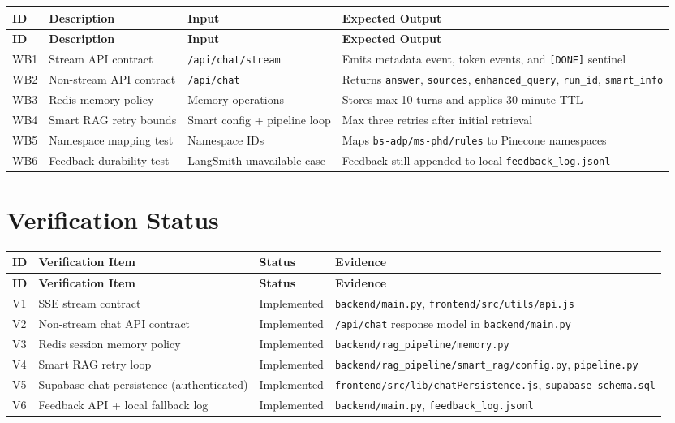 \documentclass[12pt,a4paper]{book}
\numberwithin{table}{chapter}
\numberwithin{figure}{chapter}
\numberwithin{equation}{chapter}
\begin{document}
\begin{longtable}{|p{0.5in}|p{1.5in}|p{1.5in}|p{1.5in}|}
\hline
\textbf{ID} & \textbf{Description} & \textbf{Input} & \textbf{Expected Output}\\
\hline
\endfirsthead
\hline
\textbf{ID} & \textbf{Description} & \textbf{Input} & \textbf{Expected Output}\\
\hline
\endhead
\hline
WB1 & Stream API contract & \texttt{/api/chat/stream} & Emits metadata event, token events, and \texttt{[DONE]} sentinel\\
\hline
WB2 & Non-stream API contract & \texttt{/api/chat} & Returns \texttt{answer}, \texttt{sources}, \texttt{enhanced\_query}, \texttt{run\_id}, \texttt{smart\_info}\\
\hline
WB3 & Redis memory policy & Memory operations & Stores max 10 turns and applies 30-minute TTL\\
\hline
WB4 & Smart RAG retry bounds & Smart config + pipeline loop & Max three retries after initial retrieval\\
\hline
WB5 & Namespace mapping test & Namespace IDs & Maps \texttt{bs-adp/ms-phd/rules} to Pinecone namespaces\\
\hline
WB6 & Feedback durability test & LangSmith unavailable case & Feedback still appended to local \texttt{feedback\_log.jsonl}\\
\hline
\end{longtable}

\section{Verification Status}

\begin{longtable}{|p{0.5in}|p{2in}|p{1in}|p{1.5in}|}
\hline
\textbf{ID} & \textbf{Verification Item} & \textbf{Status} & \textbf{Evidence}\\
\hline
\endfirsthead
\hline
\textbf{ID} & \textbf{Verification Item} & \textbf{Status} & \textbf{Evidence}\\
\hline
\endhead
\hline
V1 & SSE stream contract & Implemented & \texttt{backend/main.py}, \texttt{frontend/src/utils/api.js}\\
\hline
V2 & Non-stream chat API contract & Implemented & \texttt{/api/chat} response model in \texttt{backend/main.py}\\
\hline
V3 & Redis session memory policy & Implemented & \texttt{backend/rag\_pipeline/memory.py}\\
\hline
V4 & Smart RAG retry loop & Implemented & \texttt{backend/rag\_pipeline/smart\_rag/config.py}, \texttt{pipeline.py}\\
\hline
V5 & Supabase chat persistence (authenticated) & Implemented & \texttt{frontend/src/lib/chatPersistence.js}, \texttt{supabase\_schema.sql}\\
\hline
V6 & Feedback API + local fallback log & Implemented & \texttt{backend/main.py}, \texttt{feedback\_log.jsonl}\\
\hline
\end{longtable}
\end{document}
